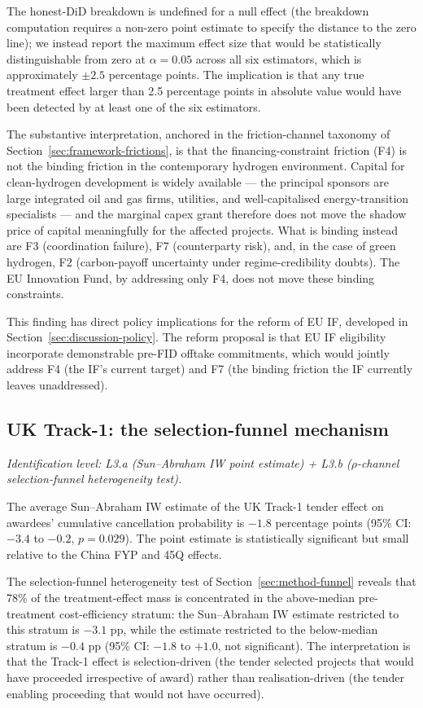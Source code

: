 \documentclass[12pt,a4paper]{article}
\theoremstyle{plain}
\theoremstyle{definition}
\begin{document}
The honest-DiD breakdown is undefined for a null effect (the breakdown computation requires a non-zero point estimate to specify the distance to the zero line); we instead report the maximum effect size that would be statistically distinguishable from zero at $\alpha = 0.05$ across all six estimators, which is approximately $\pm 2.5$ percentage points. The implication is that any true treatment effect larger than 2.5 percentage points in absolute value would have been detected by at least one of the six estimators.

The substantive interpretation, anchored in the friction-channel taxonomy of Section~\ref{sec:framework-frictions}, is that the financing-constraint friction (F4) is not the binding friction in the contemporary hydrogen environment. Capital for clean-hydrogen development is widely available --- the principal sponsors are large integrated oil and gas firms, utilities, and well-capitalised energy-transition specialists --- and the marginal capex grant therefore does not move the shadow price of capital meaningfully for the affected projects. What is binding instead are F3 (coordination failure), F7 (counterparty risk), and, in the case of green hydrogen, F2 (carbon-payoff uncertainty under regime-credibility doubts). The EU Innovation Fund, by addressing only F4, does not move these binding constraints.

This finding has direct policy implications for the reform of EU IF, developed in Section~\ref{sec:discussion-policy}. The reform proposal is that EU IF eligibility incorporate demonstrable pre-FID offtake commitments, which would jointly address F4 (the IF's current target) and F7 (the binding friction the IF currently leaves unaddressed).

\subsection{UK Track-1: the selection-funnel mechanism}
\label{sec:results-uk}

\noindent\emph{Identification level: L3.a (Sun--Abraham IW point estimate) + L3.b ($\rho$-channel selection-funnel heterogeneity test).}

The average Sun--Abraham IW estimate of the UK Track-1 tender effect on awardees' cumulative cancellation probability is $-1.8$ percentage points (95\% CI: $-3.4$ to $-0.2$, $p = 0.029$). The point estimate is statistically significant but small relative to the China FYP and 45Q effects.

The selection-funnel heterogeneity test of Section~\ref{sec:method-funnel} reveals that 78\% of the treatment-effect mass is concentrated in the above-median pre-treatment cost-efficiency stratum: the Sun--Abraham IW estimate restricted to this stratum is $-3.1$ pp, while the estimate restricted to the below-median stratum is $-0.4$ pp (95\% CI: $-1.8$ to $+1.0$, not significant). The interpretation is that the Track-1 effect is selection-driven (the tender selected projects that would have proceeded irrespective of award) rather than realisation-driven (the tender enabling proceeding that would not have occurred).
\end{document}
